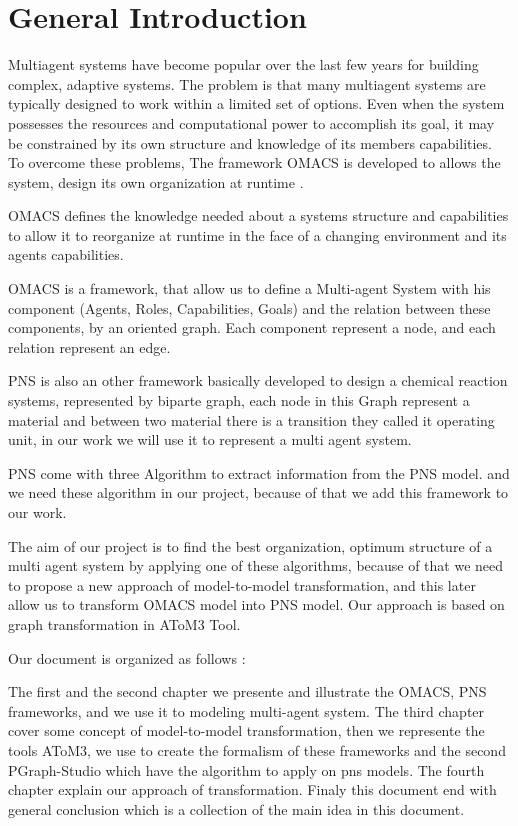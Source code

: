 \chapter*{General Introduction}

\textbf{}



Multiagent systems have become popular over the last few years for building complex, adaptive systems. 
The problem is that many multiagent systems are typically designed to work within 
a limited set of options. Even when the system possesses the resources and
computational power to accomplish its goal, it may be constrained by its own structure and knowledge
of its members capabilities. To overcome these problems, The framework OMACS is developed to allows the system, design its own organization at runtime \cite{omacs4}.

OMACS defines the knowledge needed about a systems structure and capabilities to allow it to reorganize at runtime in the face of a changing environment and its agents capabilities\cite{omacs4}\cite{omacs2}.

OMACS is a framework, that allow us to define a Multi-agent System with his component (Agents, Roles, Capabilities, Goals) and the relation between these components, 
by an oriented graph. Each component represent a node, and each relation represent an edge.
 
PNS is also an other framework basically developed to design a chemical reaction systems, represented by biparte graph, each node in this Graph represent a material and between two material there is a transition they called it operating unit, in our work we will use it to represent a multi agent system. 

PNS come with three Algorithm to extract information from the PNS model. and we need these algorithm in our project, because of that we add this framework 
to our work.

The aim of our project is to find the best organization, optimum structure of a multi agent system by applying one of these algorithms, 
because of that we need to propose a new approach of model-to-model transformation, and this later allow us to transform OMACS model into PNS model. Our approach is based on graph transformation in AToM3 Tool.

Our document is organized as follows :

The first and the second chapter we presente and illustrate the OMACS, PNS frameworks, and we use it to modeling multi-agent system.
The third chapter cover some concept of model-to-model transformation, then we represente the tools AToM3, we use to create the formalism of these frameworks and the second PGraph-Studio which have the algorithm to apply on pns models. 
The fourth chapter explain our approach of transformation. 
Finaly this document end with general conclusion which is a collection of the main idea in this document.

 



